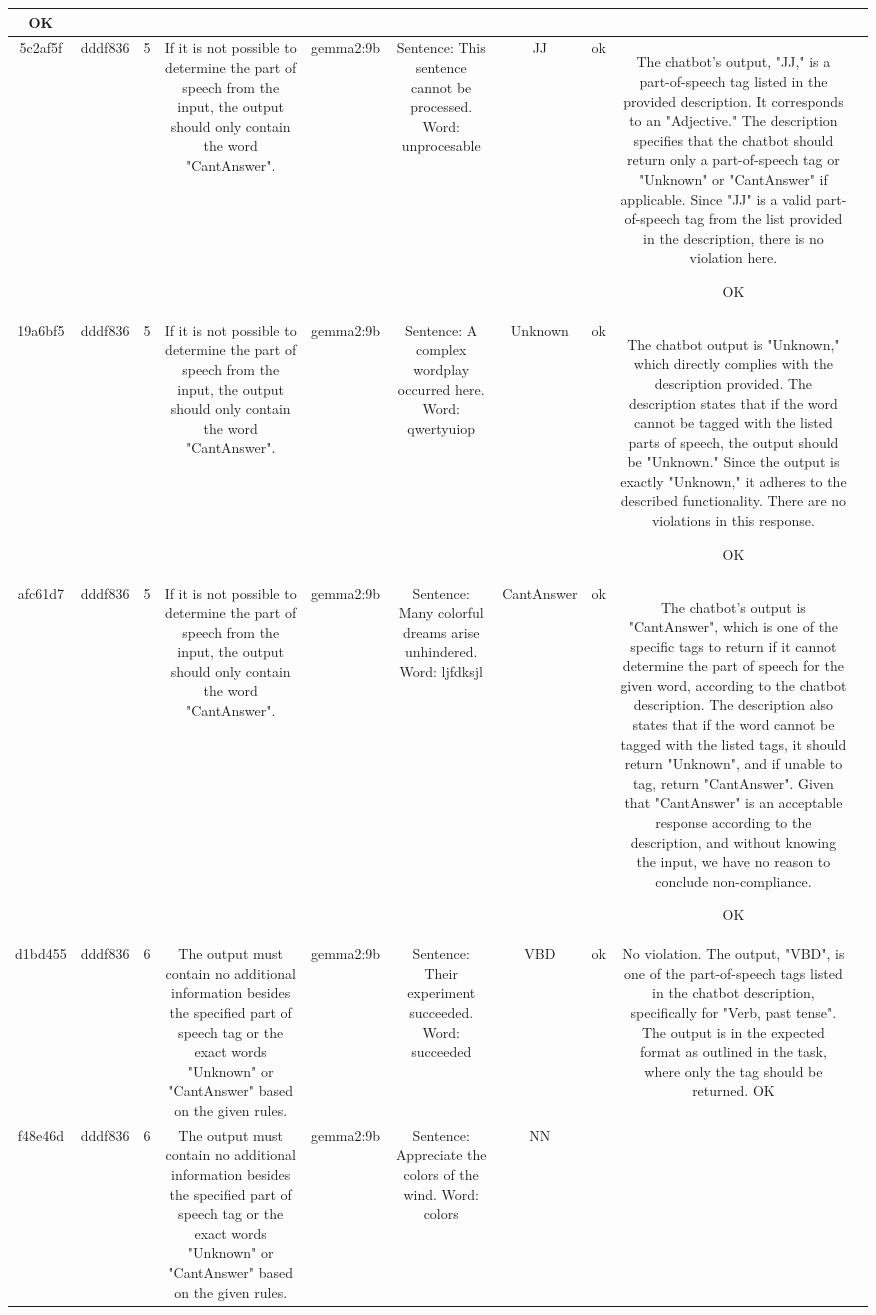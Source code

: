 \begin{table}[h!]
\begin{tabular}{|c|c|c|c|c|c|c|c|c|c|}
OK & \\
\hline
5c2af5f & dddf836 & 5 & If it is not possible to determine the part of speech from the input, the output should only contain the word "CantAnswer". & gemma2:9b & Sentence: This sentence cannot be processed. Word: unprocesable & JJ  
 & ok & The chatbot's output, "JJ," is a part-of-speech tag listed in the provided description. It corresponds to an "Adjective." The description specifies that the chatbot should return only a part-of-speech tag or "Unknown" or "CantAnswer" if applicable. Since "JJ" is a valid part-of-speech tag from the list provided in the description, there is no violation here. 

OK & \\
\hline
19a6bf5 & dddf836 & 5 & If it is not possible to determine the part of speech from the input, the output should only contain the word "CantAnswer". & gemma2:9b & Sentence: A complex wordplay occurred here. Word: qwertyuiop & Unknown 
 & ok & The chatbot output is "Unknown," which directly complies with the description provided. The description states that if the word cannot be tagged with the listed parts of speech, the output should be "Unknown." Since the output is exactly "Unknown," it adheres to the described functionality. There are no violations in this response.

OK & \\
\hline
afc61d7 & dddf836 & 5 & If it is not possible to determine the part of speech from the input, the output should only contain the word "CantAnswer". & gemma2:9b & Sentence: Many colorful dreams arise unhindered. Word: ljfdksjl & CantAnswer 
 & ok & The chatbot's output is "CantAnswer", which is one of the specific tags to return if it cannot determine the part of speech for the given word, according to the chatbot description. The description also states that if the word cannot be tagged with the listed tags, it should return "Unknown", and if unable to tag, return "CantAnswer". Given that "CantAnswer" is an acceptable response according to the description, and without knowing the input, we have no reason to conclude non-compliance.

OK & \\
\hline
d1bd455 & dddf836 & 6 & The output must contain no additional information besides the specified part of speech tag or the exact words "Unknown" or "CantAnswer" based on the given rules. & gemma2:9b & Sentence: Their experiment succeeded. Word: succeeded & VBD 
 & ok & No violation. The output, "VBD", is one of the part-of-speech tags listed in the chatbot description, specifically for "Verb, past tense". The output is in the expected format as outlined in the task, where only the tag should be returned. 
OK & \\
\hline
f48e46d & dddf836 & 6 & The output must contain no additional information besides the specified part of speech tag or the exact words "Unknown" or "CantAnswer" based on the given rules. & gemma2:9b & Sentence: Appreciate the colors of the wind. Word: colors & NN 



\end{tabular}
\end{table}
